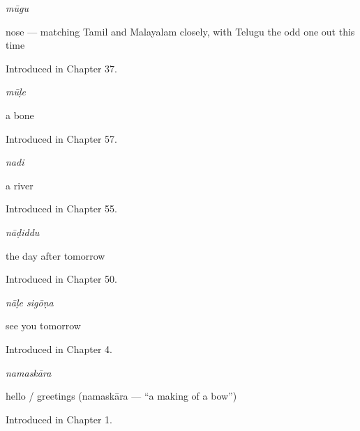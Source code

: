 \noindent\begin{minipage}[t]{\linewidth}
\raggedright
\textbf{}\enspace\emph{mūgu}\par
\small nose — matching Tamil and Malayalam closely, with Telugu the odd one out this time\par
\footnotesize Introduced in Chapter 37.
\end{minipage}\par\medskip

\noindent\begin{minipage}[t]{\linewidth}
\raggedright
\textbf{}\enspace\emph{mūḷe}\par
\small a bone\par
\footnotesize Introduced in Chapter 57.
\end{minipage}\par\medskip

\noindent\begin{minipage}[t]{\linewidth}
\raggedright
\textbf{}\enspace\emph{nadi}\par
\small a river\par
\footnotesize Introduced in Chapter 55.
\end{minipage}\par\medskip

\noindent\begin{minipage}[t]{\linewidth}
\raggedright
\textbf{}\enspace\emph{nāḍiddu}\par
\small the day after tomorrow\par
\footnotesize Introduced in Chapter 50.
\end{minipage}\par\medskip

\noindent\begin{minipage}[t]{\linewidth}
\raggedright
\textbf{ }\enspace\emph{nāḷe sigōṇa}\par
\small see you tomorrow\par
\footnotesize Introduced in Chapter 4.
\end{minipage}\par\medskip

\noindent\begin{minipage}[t]{\linewidth}
\raggedright
\textbf{}\enspace\emph{namaskāra}\par
\small hello / greetings (namaskāra — \textquotedblleft{}a making of a bow\textquotedblright{})\par
\footnotesize Introduced in Chapter 1.
\end{minipage}\par\medskip

